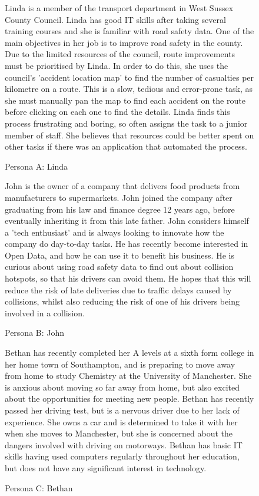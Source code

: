 \documentclass[authoryearcitations]{UoYCSproject}
\begin{document}
\begin{figure}
	\begin{framed}
 		Linda is a member of the transport department in West Sussex County Council. Linda has good IT skills after taking several training courses and she is familiar with road safety data. One of the main objectives in her job is to improve road safety in the county. Due to the limited resources of the council, route improvements must be prioritised by Linda. In order to do this, she uses the council's 'accident location map' to find the number of casualties per kilometre on a route. This is a slow, tedious and error-prone task, as she must manually pan the map to find each accident on the route before clicking on each one to find the details. Linda finds this process frustrating and boring, so often assigns the task to a junior member of staff. She believes that resources could be better spent on other tasks if there was an application that automated the process.
  	\end{framed}
  \caption{Persona A: Linda}
  \label{fig:personaA}
\end{figure}

\begin{figure}
	\begin{framed}
 		John is the owner of a company that delivers food products from manufacturers to supermarkets. John joined the company after graduating from his law and finance degree 12 years ago, before eventually inheriting it from this late father. John considers himself a 'tech enthusiast' and is always looking to innovate how the company do day-to-day tasks. He has recently become interested in Open Data, and how he can use it to benefit his business. He is curious about using road safety data to find out about collision hotspots, so that his drivers can avoid them. He hopes that this will reduce the risk of late deliveries due to traffic delays caused by collisions, whilst also reducing the risk of one of his drivers being involved in a collision. 	\end{framed}
  \caption{Persona B: John}
  \label{fig:personaB}
\end{figure}

\begin{figure}
	\begin{framed}
 		Bethan has recently completed her A levels at a sixth form college in her home town of Southampton, and is preparing to move away from home to study Chemistry at the University of Manchester. She is anxious about moving so far away from home, but also excited about the opportunities for meeting new people. Bethan has recently passed her driving test, but is a nervous driver due to her lack of experience. She owns a car and is determined to take it with her when she moves to Manchester, but she is concerned about the dangers involved with driving on motorways. Bethan has basic IT skills having used computers regularly throughout her education, but does not have any significant interest in technology.		
 	\end{framed}
  \caption{Persona C: Bethan}
  \label{fig:personaC}
\end{figure}
\end{document}
